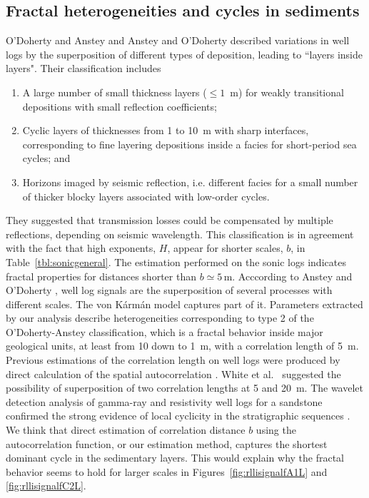 \subsection{Fractal heterogeneities and cycles in sediments}


O'Doherty and Anstey  and Anstey and O'Doherty  
described variations in well logs by the superposition of 
different types of deposition, leading to ``layers inside layers". 
Their classification includes
\begin{enumerate}
\renewcommand{\theenumi}{\arabic{enumi}}
\item A large number of small thickness layers ($\leq 1$~m)
for weakly transitional depositions with small reflection coefficients;
\item Cyclic layers of thicknesses from 1 to 10~m with sharp interfaces,
corresponding to fine layering depositions inside a facies
for short-period sea cycles; and
\item Horizons imaged by seismic reflection, i.e. different facies for a small number of thicker blocky layers associated with low-order cycles.
\end{enumerate}
They suggested that transmission losses could be compensated by multiple reflections, depending on seismic wavelength.
This classification is in agreement with the fact that high exponents, $H$, appear for shorter scales, $b$, in Table~\ref{tbl:sonicgeneral}.
The estimation performed on the sonic logs
indicates fractal properties for distances shorter than $b\simeq 5$\,m.
Acccording to Anstey and O'Doherty ,
well log signals are the superposition of several processes with different scales.
The von K\'arm\'an model captures part of it.
Parameters extracted by our analysis describe heterogeneities
corresponding to type 2 of the O'Doherty-Anstey classification,
which is a fractal behavior inside major geological units, at least from 10 down to 1~m,
with a correlation length of 5~m.
Previous estimations of the correlation length on well logs
were produced by direct calculation of the spatial autocorrelation \cite[]{White_SN90,Shiomi_SO97}.
White et al.~ suggested the possibility of superposition of two correlation lengths at 5 and 20~m.
The wavelet detection analysis of gamma-ray and resistivity well logs
for a sandstone confirmed the strong evidence of local cyclicity in the stratigraphic sequences \cite[]{Rivera_RJCA04}.
We think that direct estimation of correlation distance $b$ using the autocorrelation function, or our estimation method,
captures the shortest dominant cycle in the sedimentary layers.
This would explain why the fractal behavior seems to hold for larger scales 
in Figures~\ref{fig:rllisignalfA1L} and \ref{fig:rllisignalfC2L}.

